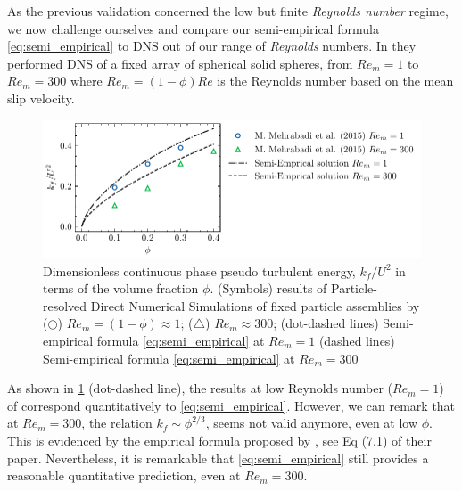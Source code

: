 As the previous validation concerned the low but finite \textit{Reynolds number} regime, we now challenge ourselves and compare our semi-empirical formula \eqref{eq:semi_empirical} to DNS out of our range of \textit{Reynolds} numbers. 
In \citet{mehrabadi2015pseudo} they performed DNS of a fixed array of spherical solid spheres, from $Re_m = 1$ to $Re_m=300$ where $Re_m = (1- \phi) Re$ is the Reynolds number based on the mean slip velocity. 
\begin{figure}
    \centering
    \includegraphics[height = 0.25\textwidth]{image/HOMOGENEOUS_final/CA/tenneti.pdf}
    \caption{Dimensionless continuous phase pseudo turbulent energy, $k_f/U^2$ in terms of the volume fraction $\phi$.
    (Symbols) 
    results of Particle-resolved Direct Numerical Simulations
    of fixed particle assemblies by \citet{mehrabadi2015pseudo}
    ($\pmb\bigcirc$) $Re_m = (1-\phi) \approx 1$; ($\pmb\triangle$) $Re_m \approx 300$;
    (dot-dashed lines) Semi-empirical formula \ref{eq:semi_empirical} at $Re_m = 1$
    (dashed lines) Semi-empirical formula \ref{eq:semi_empirical} at $Re_m = 300$
    }
    \label{fig:tennet}
\end{figure}
As shown in \ref{fig:tennet} (dot-dashed line), the results at low Reynolds number ($Re_m=1$) of \citet{mehrabadi2015pseudo}  correspond quantitatively to \eqref{eq:semi_empirical}. 
However, we can remark that at $Re_m = 300$, the relation $k_f \sim \phi^{2/3}$, seems not valid anymore, even at low $\phi$. 
This is evidenced by the empirical formula proposed by \citet{mehrabadi2015pseudo}, see Eq (7.1) of their paper. 
Nevertheless, it is remarkable that \ref{eq:semi_empirical} still provides a reasonable quantitative prediction, even at $Re_m = 300$. 



